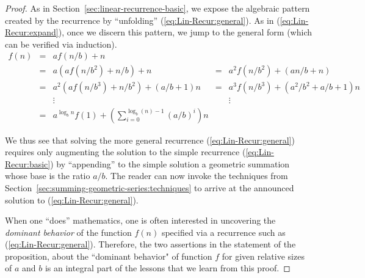\begin{proof}
As in Section~\ref{sec:linear-recurrence-basic}, we expose the algebraic pattern created by the recurrence by ``unfolding'' (\ref{eq:Lin-Recur:general}).  As in (\ref{eq:Lin-Recur:expand}), once
we discern this pattern, we jump to the general form (which can be verified via induction).
\[
\begin{array}{ccccc}
f(n) & = & a f(n/b) + n & & \\
     & = & a \left( a f(n/b^2) + n/b \right) + n
             & = & a^2 f(n/b^2) + (an/b+n) \\
     & = & a^2 \left( a f(n/b^3) + n/b^2 \right) + (a/b+1)n
             & = & a^3 f(n/b^3) + (a^2/b^2+a/b+1)n \\
     &   & \vdots & & \vdots \\
    & = & 
{\displaystyle
a^{\log_b n} f(1) + \left( \sum_{i=0}^{\log_b (n)-1} (a/b)^i \right) n
} & &
\end{array}
\]

\smallskip

We thus see that solving the more general recurrence (\ref{eq:Lin-Recur:general}) requires only augmenting the solution to the simple recurrence (\ref{eq:Lin-Recur:basic}) by ``appending'' to
the simple solution a geometric summation whose base is the ratio $a/b$.  The reader can now invoke the techniques from Section~\ref{sec:summing-geometric-series:techniques} to arrive at the announced solution to (\ref{eq:Lin-Recur:general}).

\medskip

When one ``does'' mathematics, one is often interested in uncovering the {\em dominant behavior} of the function $f(n)$ specified via a recurrence such as (\ref{eq:Lin-Recur:general}).  Therefore, the two assertions in the statement of the proposition, about the ``dominant behavior" of function $f$ for given relative sizes of $a$ and $b$ is an integral part of the lessons that we learn from this proof.

\medskip


\end{proof}
